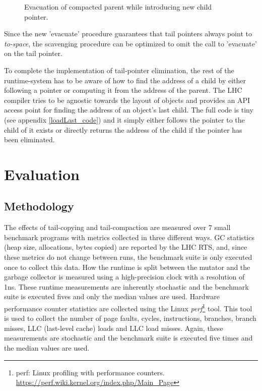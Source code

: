 \documentclass[a4paper,oneside]{memoir}
\begin{document}
\begin{figure}
  
  \caption{Evacuation of compacted parent while introducing new child pointer.}
  \label{parent_no_child}
\end{figure}

Since the new 'evacuate' procedure guarantees that tail pointers always point
to \emph{to-space}, the scavenging procedure can be optimized to omit the
call to 'evacuate' on the tail pointer.

To complete the implementation of tail-pointer elimination, the rest of the
runtime-system has to be aware of how to find the address of a child by either
following a pointer or computing it from the address of the parent. The LHC
compiler tries to be agnostic towards the layout of objects and provides
an API access point for finding the address of an object's last child. The full
code is tiny (see appendix \ref{loadLast_code}) and it simply either follows the
pointer to the child of it exists or directly returns the address of the child
if the pointer has been eliminated.



\chapter{Evaluation}

\section{Methodology}
The effects of tail-copying and tail-compaction are measured over 7 small
benchmark programs with metrics collected in three different ways.
GC statistics (heap size, allocations, bytes copied) are reported by the LHC RTS,
and, since these metrics do not change between runs, the benchmark suite is only
executed once to collect this data.
How the runtime is split between the mutator and the garbage collector is
measured using a high-precision clock with a resolution of 1ns. These runtime
measurements are inherently stochastic and the benchmark suite is executed
fives and only the median values are used.
Hardware performance counter statistics are collected using the Linux
\emph{perf}\footnote{perf: Linux profiling with performance counters. \url{https://perf.wiki.kernel.org/index.php/Main_Page}}
tool. This tool is used to collect the number of page faults, cycles, instructions,
branches, branch misses, LLC (last-level cache) loads and LLC load misses. Again,
these measurements are stochastic and the benchmark suite is executed five times
and the median values are used.
\end{document}

